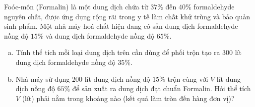 \begin{bt}%
Foóc-môn (Formalin) là một dung dịch chứa từ $37\%$ đến $40\%$ formaldehyde nguyên chất, được ứng dụng rộng rãi trong y tế làm chất khử trùng và bảo quản sinh phẩm. Một nhà máy hoá chất hiện đang có sẵn dung dịch formaldehyde nồng độ $15\%$ và dung dịch formaldehyde nồng độ $65\%$.
\begin{enumerate}[a)]
	\item Tính thể tích mỗi loại dung dịch trên cần dùng để phối trộn tạo ra $300$ lít dung dịch formaldehyde nồng độ $35\%$.
	\item Nhà máy sử dụng $200$ lít dung dịch nồng độ $15\%$ trộn cùng với $V$ lít dung dịch nồng độ $65\%$ để sản xuất ra dung dịch đạt chuẩn Formalin. Hỏi thể tích $V$ (lít) phải nằm trong khoảng nào (kết quả làm tròn đến hàng đơn vị)?
\end{enumerate}
\end{bt}
